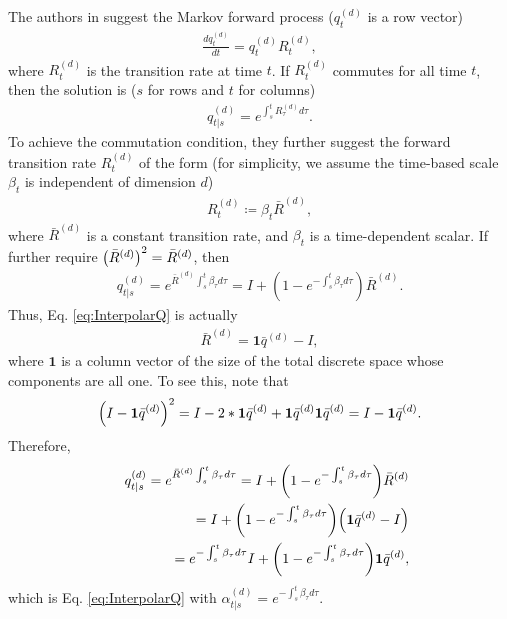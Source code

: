 \documentclass{article}
\begin{document}
The authors in \cite{campbell2022continuous} suggest the Markov forward process ($q^{(d)}_t$ is a row vector)
\begin{eqnarray*}
\frac{d q^{(d)}_t}{dt}=q^{(d)}_t R^{(d)}_t,  
\end{eqnarray*}
where $R^{(d)}_t$ is the transition rate at time $t$. If $R^{(d)}_t$ commutes for all time $t$, then the solution is ($s$ for rows and $t$ for columns)
\begin{eqnarray*}
q^{(d)}_{t|s} = e^{\int_s^t R^{(d)}_\tau d\tau}.  
\end{eqnarray*}
To achieve the commutation condition, they further suggest the forward transition rate $R^{(d)}_t$ of the form (for simplicity, we assume the time-based scale $\beta_t$ is independent of dimension $d$)
\begin{eqnarray*}
R^{(d)}_t\coloneqq \beta_t \bar{R}^{(d)},  
\end{eqnarray*}
where $\bar{R}^{(d)}$ is a constant transition rate, and $\beta_t$ is a time-dependent scalar. If further require $\qty(\bar{R}^{(d)})^2 = \bar{R}^{(d)}$, then
\begin{eqnarray*}
  q^{(d)}_{t|s} = e^{\bar{R}^{(d)}\int_s^t \beta_\tau d\tau} = I + (1 - e^{-\int_s^t \beta_\tau d\tau})\bar{R}^{(d)}.
\end{eqnarray*}
Thus, Eq. \eqref{eq:InterpolarQ} is actually
\begin{eqnarray}\label{eq:RtExpress}
\bar{R}^{(d)} = \mathbf{1}\bar{q}^{(d)} - I,  
\end{eqnarray}
where $\mathbf{1}$ is a column vector of the size of the total discrete space whose components are all one. To see this, note that
\begin{eqnarray*}
    \qty(I - \mathbf{1}\bar{q}^{(d)})^2 = I - 2 * \mathbf{1}\bar{q}^{(d)} + \mathbf{1}\bar{q}^{(d)}\mathbf{1}\bar{q}^{(d)} = I - \mathbf{1}\bar{q}^{(d)}.
\end{eqnarray*}
Therefore,
\begin{eqnarray}\label{eq:ForDiff}
    &&q^{(d)}_{t|s} = e^{\bar{R}^{(d)}\int_s^t \beta_\tau d\tau} = I + \qty(1 - e^{-\int_s^t \beta_\tau d\tau})\bar{R}^{(d)} \nonumber\\
    && = I + \qty(1 - e^{-\int_s^t \beta_\tau d\tau})\qty(\mathbf{1}\bar{q}^{(d)} - I) \nonumber\\
    && = e^{-\int_s^t \beta_\tau d\tau} I + \qty(1 - e^{-\int_s^t \beta_\tau d\tau})\mathbf{1}\bar{q}^{(d)},
\end{eqnarray}
which is Eq. \eqref{eq:InterpolarQ} with $\alpha^{(d)}_{t|s} = e^{-\int_s^t \beta_\tau d\tau}$.
\end{document}
